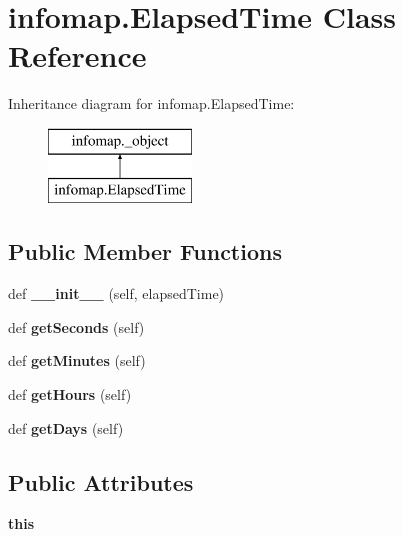 \hypertarget{classinfomap_1_1ElapsedTime}{}\section{infomap.\+Elapsed\+Time Class Reference}
\label{classinfomap_1_1ElapsedTime}
Inheritance diagram for infomap.\+Elapsed\+Time\+:\begin{figure}[H]
\begin{center}
\leavevmode
\includegraphics[height=2.000000cm]{classinfomap_1_1ElapsedTime}
\end{center}
\end{figure}
\subsection*{Public Member Functions}
\begin{DoxyCompactItemize}
\item 
\mbox{\label{classinfomap_1_1ElapsedTime_a046bd9b8d440eb02643404250ef4882b}} 
def {\bfseries \+\_\+\+\_\+init\+\_\+\+\_\+} (self, elapsed\+Time)
\item 
\mbox{\label{classinfomap_1_1ElapsedTime_a777fb002638c7b642e6e2309cc24f320}} 
def {\bfseries get\+Seconds} (self)
\item 
\mbox{\label{classinfomap_1_1ElapsedTime_a341a6cc7a8cbce6f1c2b472a59ce8555}} 
def {\bfseries get\+Minutes} (self)
\item 
\mbox{\label{classinfomap_1_1ElapsedTime_a3e84c358d246a67e8afaa52f967d95dd}} 
def {\bfseries get\+Hours} (self)
\item 
\mbox{\label{classinfomap_1_1ElapsedTime_a70992c4c7ff6a200e4b49b94003ad9fa}} 
def {\bfseries get\+Days} (self)
\end{DoxyCompactItemize}
\subsection*{Public Attributes}
\begin{DoxyCompactItemize}
\item 
\mbox{\label{classinfomap_1_1ElapsedTime_ada8b1a90e01809a9e99c630f013ce3e2}} 
{\bfseries this}
\end{DoxyCompactItemize}
